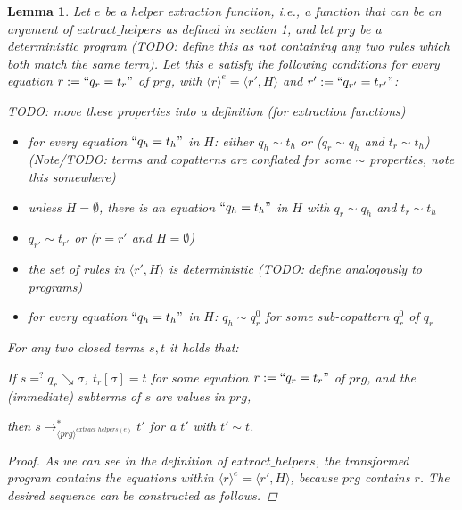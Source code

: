 \documentclass[11pt]{article} %
\newtheorem{lemma}{Lemma}
\begin{document}

\begin{lemma}

Let $e$ be a helper extraction function, i.e., a function that can be an argument of $extract\_helpers$ as defined in section 1, and let $prg$ be a deterministic program (TODO: define this as not containing any two rules which both match the same term). Let this $e$ satisfy the following conditions for every equation $r := `` q_r = t_r "$ of $prg$, with $\langle r \rangle^e = \big\langle r', H \big\rangle$ and $r' := `` q_{r'} = t_{r'} "$:

TODO: move these properties into a definition (for extraction functions)

\begin{itemize}
\item for every equation $`` q_h = t_h "$ in $H$: either $q_h \sim t_h$ or ($q_r \sim q_h$ and $t_r \sim t_h$) (Note/TODO: terms and copatterns are conflated for some $\sim$ properties, note this somewhere)

\item unless $H = \emptyset$, there is an equation $`` q_h = t_h "$ in $H$ with $q_r \sim q_h$ and $t_r \sim t_h$

\item $q_{r'} \sim t_{r'}$ or ($r = r'$ and $H = \emptyset$)

\item the set of rules in $\big\langle r', H \big\rangle$ is deterministic (TODO: define analogously to programs)

\item for every equation $`` q_h = t_h "$ in $H$: $q_h \sim q^0_r$ for some sub-copattern $q^0_r$ of $q_r$
\end{itemize}
For any two closed terms $s,t$ it holds that:

If $s =^? q_r \searrow \sigma$, $t_r[\sigma] = t$ for some equation $r := `` q_r = t_r "$ of $prg$, and the (immediate) subterms of $s$ are values in $prg$,

then $s \longrightarrow^*_{\langle prg \rangle^{extract\_helpers(e)}} t'$ for a $t'$ with $t' \sim t$.

\begin{proof}

As we can see in the definition of $extract\_helpers$, the transformed program contains the equations within $\langle r \rangle^e = \big\langle r', H \big\rangle$, because $prg$ contains $r$. The desired sequence can be constructed as follows.


\end{proof}
\end{lemma}
\end{document}
